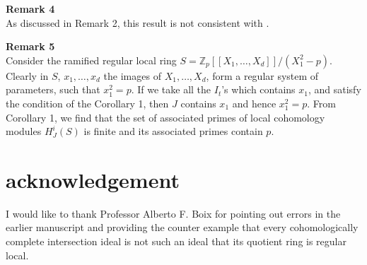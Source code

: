 \documentclass[10pt]{amsart}
\theoremstyle{plain}
\theoremstyle{definition}
\begin{document}
{\bf Remark 4}\\

As discussed in Remark 2, this result is not consistent with \cite{Ma}.

{\bf Remark 5}\\

Consider the ramified regular local ring $S= {\mathbb{Z}}_p[[X_1,\dots, X_d]]/(X^2_1-p)$. Clearly in $S$, $x_1,\dots, x_d$ the images of $X_1,\dots, X_d$, form a regular system of parameters, such that $x^2_1=p$. If we take all the $I_t$'s which contains $x_1$, and satisfy the condition of the Corollary 1, then $J$ contains $x_1$ and hence $x^2_1= p$. From Corollary 1, we find that the set of associated primes of local cohomology modules $H^i_J (S)$ is finite and its associated primes contain $p$.

\section{acknowledgement}

I would like to thank Professor Alberto F. Boix for pointing out errors in the earlier manuscript and providing the counter example that every cohomologically complete intersection ideal is not such an ideal that its quotient ring is regular local.
\end{document}
